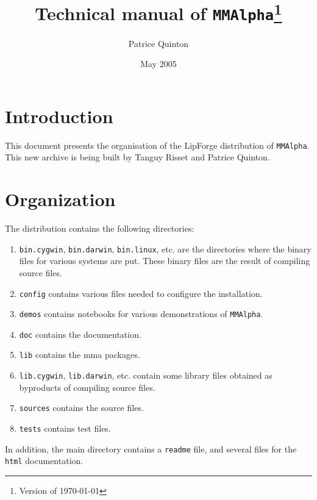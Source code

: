 \documentclass[11pt]{article}
\begin{document}
\newcommand{\mma}{\texttt{Mathematica}}
\newcommand{\mmalfa}{\texttt{MMAlpha}}

\title{Technical manual of \mmalfa{}\footnote{Version of \today{}}}
\author{Patrice Quinton}
\date{May 2005}
\maketitle
\section{Introduction}
\label{introduction}
This document presents the organisation of the LipForge distribution of 
\mmalfa{}. This new archive is being built by Tanguy Risset and Patrice Quinton.

\newcommand{\bincyg}{\texttt{bin.cygwin}}
\newcommand{\bindarw}{\texttt{bin.darwin}}
\newcommand{\binlinux}{\texttt{bin.linux}}
\newcommand{\config}{\texttt{config}}
\newcommand{\demos}{\texttt{demos}}
\newcommand{\sources}{\texttt{sources}}
\newcommand{\tests}{\texttt{tests}}
\newcommand{\doc}{\texttt{doc}}
\newcommand{\lib}{\texttt{lib}}
\newcommand{\libcyg}{\texttt{lib.cygwin}}
\newcommand{\libdarw}{\texttt{lib.darwin}}

\newcommand{\readme}{\texttt{readme}}
\newcommand{\cgen}{\texttt{Code\_gen}}
\newcommand{\makefile}{\texttt{Makefile}}
\newcommand{\bin}{\texttt{bin}}

\section{Organization}
\label{organization}
The distribution contains the following directories:
\begin{enumerate}
\item \bincyg{}, \bindarw{}, \binlinux{}, etc. are the directories where the binary 
files for various systems are put. These binary files are the result of 
compiling source files.
\item \config{} contains various files needed to configure the installation.
\item \demos{} contains notebooks for various demonstrations of \mmalfa{}.
\item \doc{} contains the documentation.
\item \lib{} contains the mma{} packages.
\item \libcyg{}, \libdarw{}, etc. contain some library files obtained as
byproducts of compiling source files.
\item \sources{} contains the source files.
\item \tests{} contains test files.
\end{enumerate}
In addition, the main directory contains a \readme{} file, and several files
for the \texttt{html} documentation. 
\end{document}
